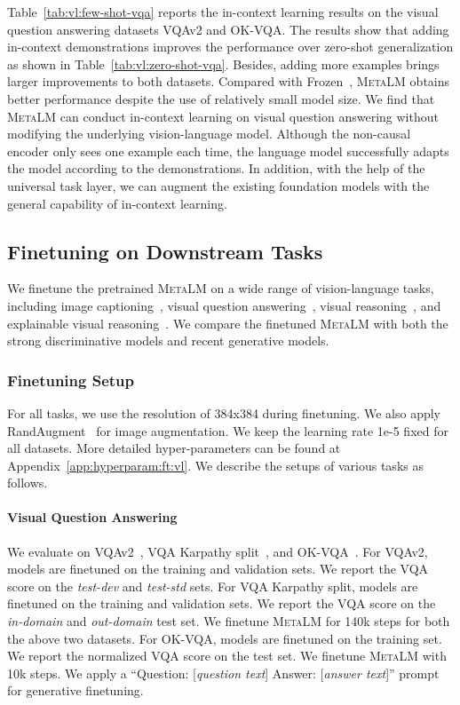 \documentclass{article}
\theoremstyle{plain}
\theoremstyle{definition}
\theoremstyle{remark}
\newcommand\ours{\textsc{MetaLM}}
\begin{document}
Table~\ref{tab:vl:few-shot-vqa} reports the in-context learning results on the visual question answering datasets VQAv2 and OK-VQA.
The results show that adding in-context demonstrations improves the performance over zero-shot generalization as shown in Table~\ref{tab:vl:zero-shot-vqa}.
Besides, adding more examples brings larger improvements to both datasets.
Compared with Frozen~\citep{tsimpoukelli2021frozen}, \ours{} obtains better performance despite the use of relatively small model size.
We find that \ours{} can conduct in-context learning on visual question answering without modifying the underlying vision-language model.
Although the non-causal encoder only sees one example each time, the language model successfully adapts the model according to the  demonstrations.
In addition, with the help of the universal task layer, we can augment the existing foundation models with the general capability of in-context learning.


\subsection{Finetuning on Downstream Tasks}
\label{sec:vl:finetuning}

We finetune the pretrained \ours{} on a wide range of vision-language tasks, including image captioning~\citep{karpathy2017deep}, visual question answering~\citep{vqav2,marino2019okvqa}, visual reasoning~\citep{nlvrv2}, and explainable visual reasoning~\citep{kayser2021vil}.
We compare the finetuned \ours{} with both the strong discriminative models and recent generative models.


\subsubsection{Finetuning Setup}

For all tasks, we use the resolution of 384x384 during finetuning.
We also apply RandAugment~\citep{cubuk2020randaugment} for image augmentation.
We keep the learning rate 1e-5 fixed for all datasets.
More detailed hyper-parameters can be found at Appendix~\ref{app:hyperparam:ft:vl}.
We describe the setups of various tasks as follows.

\paragraph{Visual Question Answering}
We evaluate on VQAv2~\citep{vqav2}, VQA Karpathy split~\citep{cho2021unifying}, and OK-VQA~\citep{marino2019okvqa}.
For VQAv2, models are finetuned on the training and validation sets. We report the VQA score on the \textit{test-dev} and \textit{test-std} sets.
For VQA Karpathy split, models are finetuned on the training and validation sets. We report the VQA score on the \textit{in-domain} and \textit{out-domain} test set.
We finetune \ours{} for 140k steps for both the above two datasets.
For OK-VQA, models are finetuned on the training set. We report the normalized VQA score on the test set. We finetune \ours{} with 10k steps.
We apply a ``Question: [\textit{question text}] Answer: [\textit{answer text}]'' prompt for generative finetuning.
\end{document}
